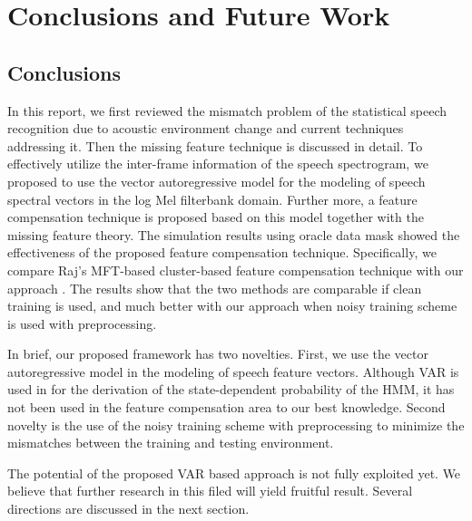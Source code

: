 \chapter{Conclusions and Future Work }

\section{Conclusions}
In this report, we first reviewed the mismatch problem of the
statistical speech recognition due to acoustic environment change
and current techniques addressing it. Then the missing feature
technique is discussed in detail. To effectively utilize the
inter-frame information of the speech spectrogram, we proposed to
use the vector autoregressive model for the modeling of speech
spectral vectors in the log Mel filterbank domain. Further more, a
feature compensation technique is proposed based on this model
together with the missing feature theory. The simulation results
using oracle data mask showed the effectiveness of the proposed
feature compensation technique. Specifically, we compare Raj's
MFT-based cluster-based feature compensation technique \cite{Raj04}
with our approach . The results show that the two methods are
comparable if clean training is used, and much better with our
approach when noisy training scheme is used with preprocessing.

In brief, our proposed framework has two novelties. First, we use
the vector autoregressive model in the modeling of speech feature
vectors. Although VAR is used in \cite{Kenny90VAR} for the
derivation of the state-dependent probability of the HMM, it has not
been used in the feature compensation area to our best knowledge.
Second novelty is the use of the noisy training scheme with
preprocessing to minimize the mismatches between the training and
testing environment.

The potential of the proposed VAR based approach is not fully
exploited yet. We believe that further research in this filed will
yield fruitful result. Several directions are discussed in the next
section.
